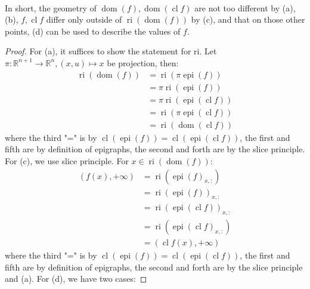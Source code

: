 \paragraph{}In short, the geometry of $\operatorname{dom}(f),\operatorname{dom}(\operatorname{cl}f)$ are not too different by (a), (b), $f,\operatorname{cl}f$ differ only outside of $\operatorname{ri}(\operatorname{dom}(f))$ by (c), and that on those other points, (d) can be used to describe the values of $f$.

\begin{proof}
	For (a), it suffices to show the statement for ri. Let $\pi:\mathbb{R}^{n+1}\to \mathbb{R}^n,(x,u)\mapsto x$ be projection, then:
	\begin{align*}
		\operatorname{ri}(\operatorname{dom}(f)) & =\operatorname{ri}(\pi \operatorname{epi}(f))                 \\
		                                         & =\pi\operatorname{ri}(\operatorname{epi}(f))                  \\
		                                         & =\pi\operatorname{ri}(\operatorname{epi}(\operatorname{cl}f)) \\
		                                         & =\operatorname{ri}(\pi\operatorname{epi}(\operatorname{cl}f)) \\
		                                         & =\operatorname{ri}(\operatorname{dom}(\operatorname{cl}f))
	\end{align*}
	where the third "=" is by $\operatorname{cl}(\operatorname{epi}(f))=\operatorname{cl}(\operatorname{epi}(\operatorname{cl}f))$, the first and fifth are by definition of epigraphs, the second and forth are by the slice principle. For (c), we use slice principle. For $x\in \operatorname{ri}(\operatorname{dom}(f))$:
	\begin{align*}
		(f(x),+\infty) & =\operatorname{ri}(\operatorname{epi}(f)_{x,:})                  \\
		               & =\operatorname{ri}(\operatorname{epi}(f))_{x,:}                  \\
		               & =\operatorname{ri}(\operatorname{epi}(\operatorname{cl}f))_{x,:} \\
		               & =\operatorname{ri}(\operatorname{epi}(\operatorname{cl}f)_{x,:}) \\
		               & =(\operatorname{cl}f(x),+\infty)
	\end{align*}
	where the third "=" is by $\operatorname{cl}(\operatorname{epi}(f))=\operatorname{cl}(\operatorname{epi}(\operatorname{cl}f))$, the first and fifth are by definition of epigraphs, the second and forth are by the slice principle and (a). For (d), we have two cases:

\end{proof}
